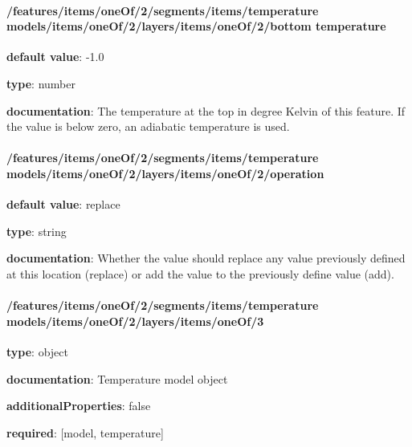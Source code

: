 \begin{itemized}
\end{itemized}\paragraph{/features/items/oneOf/2/segments/items/temperature models/items/oneOf/2/layers/items/oneOf/2/bottom temperature} \begin{itemized}
\item {\bf default value}: -1.0
\item {\bf type}: number
\item {\bf documentation}: The temperature at the top in degree Kelvin of this feature. If the value is below zero, an adiabatic temperature is used.
\end{itemized}\paragraph{/features/items/oneOf/2/segments/items/temperature models/items/oneOf/2/layers/items/oneOf/2/operation} \begin{itemized}
\item {\bf default value}: replace
\item {\bf type}: string
\item {\bf documentation}: Whether the value should replace any value previously defined at this location (replace) or add the value to the previously define value (add).
\end{itemized}\paragraph{/features/items/oneOf/2/segments/items/temperature models/items/oneOf/2/layers/items/oneOf/3} \begin{itemized}
\item {\bf type}: object
\item {\bf documentation}: Temperature model object
\item {\bf additionalProperties}: false
\item {\bf required}: [model, temperature]\end{itemized}
